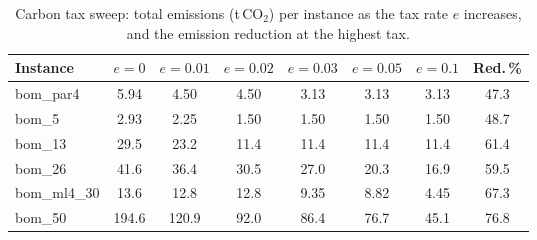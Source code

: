 \begin{table}[!htbp]\centering\small
\caption{Carbon tax sweep: total emissions (t\,CO$_2$) per instance as the tax rate $e$ increases, and the emission reduction at the highest tax.}\label{tab:tax}
\begin{tabular}{lccccccc}
\toprule
Instance & $e=0$ & $e=0.01$ & $e=0.02$ & $e=0.03$ & $e=0.05$ & $e=0.1$ & Red.\,\%\\
\midrule
bom\_par4 & 5.94 & 4.50 & 4.50 & 3.13 & 3.13 & 3.13 & 47.3 \\
bom\_5 & 2.93 & 2.25 & 1.50 & 1.50 & 1.50 & 1.50 & 48.7 \\
bom\_13 & 29.5 & 23.2 & 11.4 & 11.4 & 11.4 & 11.4 & 61.4 \\
bom\_26 & 41.6 & 36.4 & 30.5 & 27.0 & 20.3 & 16.9 & 59.5 \\
bom\_ml4\_30 & 13.6 & 12.8 & 12.8 & 9.35 & 8.82 & 4.45 & 67.3 \\
bom\_50 & 194.6 & 120.9 & 92.0 & 86.4 & 76.7 & 45.1 & 76.8 \\
\bottomrule
\end{tabular}
\end{table}
